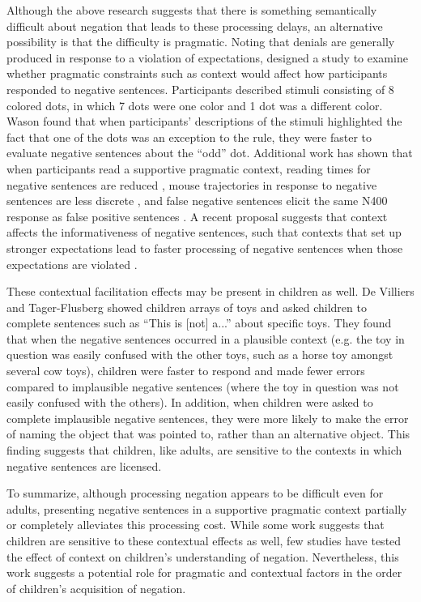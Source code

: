 \documentclass[man]{apa2}
\begin{document}
Although the above research suggests that there is something semantically difficult about negation that leads to these processing delays, an alternative possibility is that the difficulty is pragmatic. Noting that denials are generally produced in response to a violation of expectations,  designed a study to examine whether pragmatic constraints such as context would affect how participants responded to negative sentences. Participants described stimuli consisting of 8 colored dots, in which 7 dots were one color and 1 dot was a different color. Wason found that when participants' descriptions of the stimuli highlighted the fact that one of the dots was an exception to the rule, they were faster to evaluate negative sentences about the ``odd'' dot. Additional work has shown that when participants read a supportive pragmatic context, reading times for negative sentences are reduced \cite{glenberg1999, ludtke2006}, mouse trajectories in response to negative sentences are less discrete \cite{dale2011}, and false negative sentences elicit the same N400 response as false positive sentences \cite{nieuwland2008}.  A recent proposal suggests that context affects the informativeness of negative sentences, such that contexts that set up stronger expectations lead to faster processing of negative sentences when those expectations are violated \cite{nordmeyer2014}.  

These contextual facilitation effects may be present in children as well.  De Villiers and Tager-Flusberg \citeyear{devilliers1975} showed children arrays of toys and asked children to complete sentences such as ``This is [not] a...'' about specific toys.  They found that when the negative sentences occurred in a plausible context (e.g. the toy in question was easily confused with the other toys, such as a horse toy amongst several cow toys), children were faster to respond and made fewer errors compared to implausible negative sentences (where the toy in question was not easily confused with the others). In addition, when children were asked to complete implausible negative sentences, they were more likely to make the error of naming the object that was pointed to, rather than an alternative object.  This finding suggests that children, like adults, are sensitive to the contexts in which negative sentences are licensed.

To summarize, although processing negation appears to be difficult even for adults, presenting negative sentences in a supportive pragmatic context partially or completely alleviates this processing cost.  
While some work suggests that children are sensitive to these contextual effects as well, few studies have tested the effect of context on children's understanding of negation.  Nevertheless, this work suggests a potential role for pragmatic and contextual factors in the order of children's acquisition of negation.  
\end{document}
